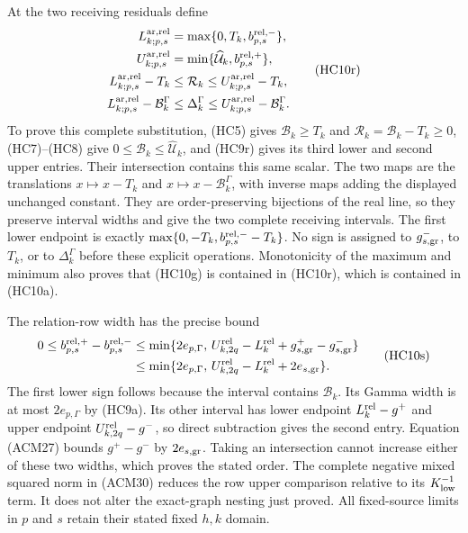 At the two receiving residuals define
\[
\begin{aligned}
 L_{k;p,s}^{\rm ar,rel}&=\max\{0,T_k,b_{p,s}^{\rm rel,-}\},\\
 U_{k;p,s}^{\rm ar,rel}&=\min\{\widehat{\mathcal U}_k,
                                              b_{p,s}^{\rm rel,+}\},\\
 L_{k;p,s}^{\rm ar,rel}-T_k
 &\leq\mathcal R_k\leq U_{k;p,s}^{\rm ar,rel}-T_k,\\
 L_{k;p,s}^{\rm ar,rel}-\mathcal B_k^\Gamma
 &\leq\Delta_k^\Gamma
                  \leq U_{k;p,s}^{\rm ar,rel}-\mathcal B_k^\Gamma.
\end{aligned}\tag{HC10r}
\]
To prove this complete substitution, (HC5) gives
$\mathcal B_k\geq T_k$ and
$\mathcal R_k=\mathcal B_k-T_k\geq0$, (HC7)--(HC8) give
$0\leq\mathcal B_k\leq\widehat{\mathcal U}_k$, and (HC9r)
gives its third lower and second upper entries. Their intersection
contains this same scalar. The two maps are the translations
$x\mapsto x-T_k$ and $x\mapsto x-\mathcal B_k^\Gamma$,
with inverse maps adding the displayed unchanged constant.
They are order-preserving bijections of the real line, so they
preserve interval widths and give the two complete receiving
intervals. The first lower endpoint is exactly
$\max\{0,-T_k,b_{p,s}^{\rm rel,-}-T_k\}$.
No sign is assigned to $g_{s,\rm gr}^-$, to $T_k$, or to
$\Delta_k^\Gamma$ before these explicit operations.
Monotonicity of the maximum and minimum also proves that (HC10g)
is contained in (HC10r), which is contained in (HC10a).

The relation-row width has the precise bound
\[
\begin{aligned}
0\leq b_{p,s}^{\rm rel,+}-b_{p,s}^{\rm rel,-}
&\leq\min\{2e_{p,\Gamma},\,
 U_{k,2q}^{\rm rel}-L_k^{\rm rel}
                      +g_{s,\rm gr}^+-g_{s,\rm gr}^-\}\\
&\leq\min\{2e_{p,\Gamma},\,
 U_{k,2q}^{\rm rel}-L_k^{\rm rel}+2e_{s,\rm gr}\}.
\end{aligned}\tag{HC10s}
\]
The first lower sign follows because the interval contains
$\mathcal B_k$. Its Gamma width is at most $2e_{p,\Gamma}$
by (HC9a). Its other interval has lower endpoint $L_k^{\rm rel}-g^+$
and upper endpoint $U_{k,2q}^{\rm rel}-g^-$, so direct subtraction
gives the second entry. Equation (ACM27) bounds $g^+-g^-$ by
$2e_{s,\rm gr}$. Taking an intersection cannot increase either
of these two widths, which proves the stated order. The complete
negative mixed squared norm in (ACM30) reduces the row upper
comparison relative to its $K_{\rm low}^{-1}$ term. It does
not alter the exact-graph nesting just proved. All fixed-source
limits in $p$ and $s$ retain their stated fixed $h,k$ domain.

